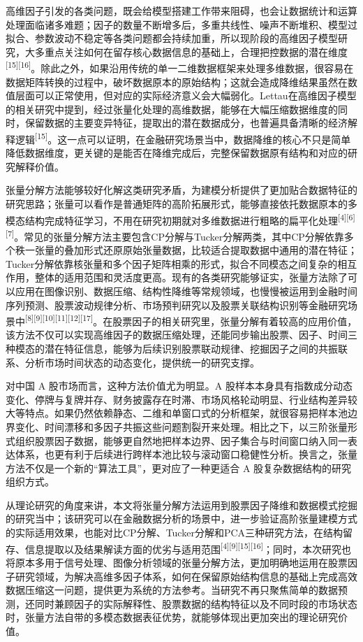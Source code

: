 高维因子引发的各类问题，既会给模型搭建工作带来阻碍，也会让数据统计和运算处理面临诸多难题；因子的数量不断增多后，多重共线性、噪声不断堆积、模型过拟合、参数波动不稳定等各类问题都会持续加重，所以现阶段的高维因子模型研究，大多重点关注如何在留存核心数据信息的基础上，合理把控数据的潜在维度\textsuperscript{[15][16]}。除此之外，如果沿用传统的单一二维数据框架来处理多维数据，很容易在数据矩阵转换的过程中，破坏数据原本的原始结构；这就会造成降维结果虽然在数值层面可以正常使用，但对应的实际经济意义会大幅弱化。Lettau在高维因子模型的相关研究中提到，经过张量化处理的高维数据，能够在大幅压缩数据维度的同时，保留数据的主要变异特征，提取出的潜在数据成分，也普遍具备清晰的经济解释逻辑\textsuperscript{[15]}。这一点可以证明，在金融研究场景当中，数据降维的核心不只是简单降低数据维度，更关键的是能否在降维完成后，完整保留数据原有结构和对应的研究解释价值。

张量分解方法能够较好化解这类研究矛盾，为建模分析提供了更加贴合数据特征的研究思路；张量可以看作是普通矩阵的高阶拓展形式，能够直接依托数据原本的多模态结构完成特征学习，不用在研究初期就对多维数据进行粗略的扁平化处理\textsuperscript{[4][6][7]}。常见的张量分解方法主要包含CP分解与Tucker分解两类，其中CP分解依靠多个秩一张量的叠加形式还原原始张量数据，比较适合提取数据中通用的潜在特征；Tucker分解依靠核张量和多个因子矩阵相乘的形式，拟合不同模态之间复杂的相互作用，整体的适用范围和灵活度更高。现有的各类研究能够证实，张量方法除了可以应用在图像识别、数据压缩、结构性降维等常规领域，也慢慢被运用到金融时间序列预测、股票波动规律分析、市场预判研究以及股票关联结构识别等金融研究场景中\textsuperscript{[8][9][10][11][12][17]}。在股票因子的相关研究里，张量分解有着较高的应用价值，该方法不仅可以实现高维因子的数据压缩处理，还能同步输出股票、因子、时间三种模态的潜在特征信息，能够为后续识别股票联动规律、挖掘因子之间的共振联系、分析市场时间状态的动态变化，提供统一的研究支撑。

对中国 A 股市场而言，这种方法价值尤为明显。A 股样本本身具有指数成分动态变化、停牌与复牌并存、财务披露存在时滞、市场风格轮动明显、行业结构差异较大等特点。如果仍然依赖静态、二维和单窗口式的分析框架，就很容易把样本池边界变化、时间漂移和多因子共振这些问题割裂开来处理。相比之下，以三阶张量形式组织股票因子数据，能够更自然地把样本边界、因子集合与时间窗口纳入同一表达体系，也更有利于后续进行跨样本池比较与滚动窗口稳健性分析。换言之，张量方法不仅是一个新的“算法工具”，更对应了一种更适合 A 股复杂数据结构的研究组织方式。

从理论研究的角度来讲，本文将张量分解方法运用到股票因子降维和数据模式挖掘的研究当中；该研究可以在金融数据分析的场景中，进一步验证高阶张量建模方式的实际适用效果，也能对比CP分解、Tucker分解和PCA三种研究方法，在结构留存、信息提取以及结果解读方面的优劣与适用范围\textsuperscript{[4][9][15][16]}；同时，本次研究也将原本多用于信号处理、图像分析领域的张量分解方法，更加明确地运用在股票因子研究领域，为解决高维多因子体系，如何在保留原始结构信息的基础上完成高效数据压缩这一问题，提供更为系统的方法参考。当研究不再只聚焦简单的数据预测，还同时兼顾因子的实际解释性、股票数据的结构特征以及不同时段的市场状态时，张量方法自带的多模态数据表征优势，就能够体现出更加突出的理论研究价值。

